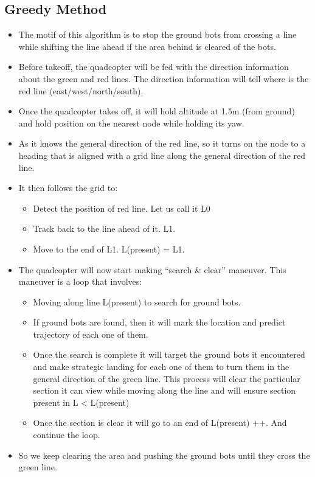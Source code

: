 \documentclass[12pt]{article}
\begin{document}
\subsection{Greedy Method}
\begin{itemize}
    \item The motif of this algorithm is to stop the ground bots from crossing a line while shifting the line ahead if the area behind is cleared of the bots.
    \item Before takeoff, the quadcopter will be fed with the direction information about the green and red lines. The direction information will tell where is the red line (east/west/north/south).
    \item Once the quadcopter takes off, it will hold altitude at 1.5m (from ground) and hold position on the nearest node while holding its yaw.
    \item As it knows the general direction of the red line, so it turns on the node to a heading that is aligned with a grid line along the general direction of the red line.
    \item It then follows the grid to:
        \begin{itemize}
            \item Detect the position of red line. Let us call it L0
            \item Track back to the line ahead of it. L1.
            \item Move to the end of L1. L(present) = L1.
        \end{itemize}
    \item The quadcopter will now start making  “search & clear” maneuver. This maneuver is a loop that involves:
        \begin{itemize}
        \item Moving along line L(present) to search for ground bots.
        \item If ground bots are found, then it will mark the location and predict trajectory of each one of them. 
        \item Once the search is complete it will target the ground bots it encountered and make strategic landing for each one of them to turn them in the general direction of the green line. This process will clear the particular section it can view while moving along the line and will ensure section present in L < L(present)
        \item Once the section is clear it will go to an end of L(present) ++. And continue the loop.
        \end{itemize}
    \item So we keep clearing the area and pushing the ground bots until they cross the green line.
\end{itemize}
\end{document}
